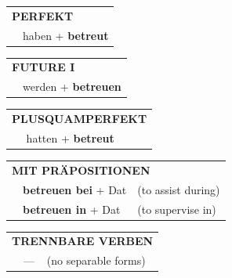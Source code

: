 \documentclass[10pt,a4paper]{revtex4-2}
\begin{document}
\begin{verbbox-acc}
\vspace{10pt}

\begin{tabular}{rl}
\multicolumn{2}{l}{\textbf{PERFEKT}}\\
& haben + \textbf{betreut}\\
\end{tabular}
\hfill
\begin{tabular}{rl}
\multicolumn{2}{l}{\textbf{FUTURE I}}\\
& werden + \textbf{betreuen}\\
\end{tabular}
\hfill
\begin{tabular}{rl}
\multicolumn{2}{l}{\textbf{PLUSQUAMPERFEKT}}\\
& hatten + \textbf{betreut}\\
\end{tabular}

\vspace{10pt}

\begin{tabular}{lll}
\multicolumn{3}{l}{\textbf{MIT PRÄPOSITIONEN}}\\
& \textbf{betreuen bei} + Dat & (to assist during)\\
& \textbf{betreuen in} + Dat & (to supervise in)\\
\end{tabular}
\hfill
\begin{tabular}{lll}
\multicolumn{3}{l}{\textbf{TRENNBARE VERBEN}}\\
& --- & (no separable forms)\\
\end{tabular}
\vspace{-5pt}
\end{verbbox-acc}
\end{document}
